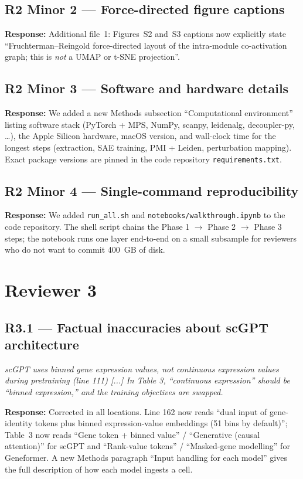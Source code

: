 \documentclass[11pt]{article}
\newcommand{\reviewercomment}[1]{\textit{\color{gray}#1}}
\newcommand{\response}[1]{\textbf{Response:} #1}
\begin{document}
\subsection*{R2 Minor 2 --- Force-directed figure captions}
\response{Additional file~1: Figures~S2 and~S3 captions now explicitly state ``Fruchterman--Reingold force-directed layout of the intra-module co-activation graph; this is \emph{not} a UMAP or t-SNE projection''.}

\subsection*{R2 Minor 3 --- Software and hardware details}
\response{We added a new Methods subsection ``Computational environment'' listing software stack (PyTorch + MPS, NumPy, scanpy, leidenalg, decoupler-py, \ldots), the Apple Silicon hardware, macOS version, and wall-clock time for the longest steps (extraction, SAE training, PMI + Leiden, perturbation mapping). Exact package versions are pinned in the code repository \texttt{requirements.txt}.}

\subsection*{R2 Minor 4 --- Single-command reproducibility}
\response{We added \texttt{run\_all.sh} and \texttt{notebooks/walkthrough.ipynb} to the code repository. The shell script chains the Phase 1 $\to$ Phase 2 $\to$ Phase 3 steps; the notebook runs one layer end-to-end on a small subsample for reviewers who do not want to commit 400~GB of disk.}

\bigskip

\section*{Reviewer 3}

\subsection*{R3.1 --- Factual inaccuracies about scGPT architecture}
\reviewercomment{scGPT uses binned gene expression values, not continuous expression values during pretraining (line 111) [...] In Table 3, ``continuous expression'' should be ``binned expression,'' and the training objectives are swapped.}

\response{Corrected in all locations. Line 162 now reads ``dual input of gene-identity tokens plus binned expression-value embeddings (51 bins by default)''; Table~3 now reads ``Gene token + binned value'' / ``Generative (causal attention)'' for scGPT and ``Rank-value tokens'' / ``Masked-gene modelling'' for Geneformer. A new Methods paragraph ``Input handling for each model'' gives the full description of how each model ingests a cell.}
\end{document}

